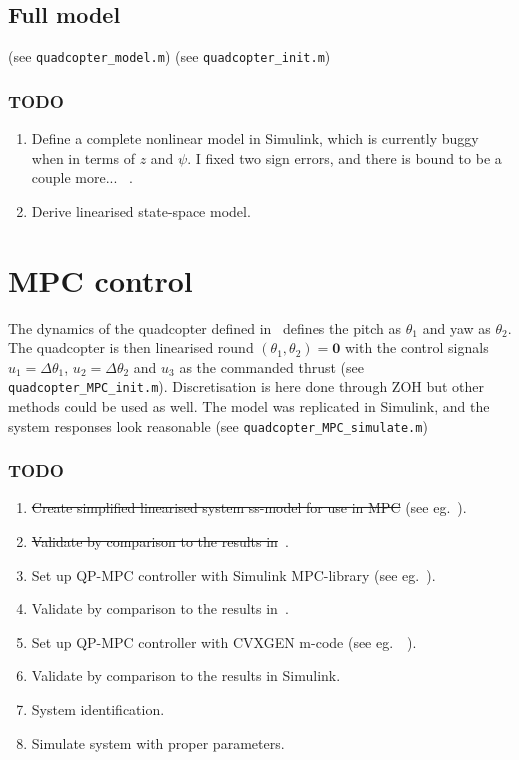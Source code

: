 \documentclass{article}
\begin{document}
\subsection{Full model}
(see \texttt{quadcopter\_model.m})
(see \texttt{quadcopter\_init.m})
\subsubsection*{TODO}
\begin{enumerate}
\item Define a complete nonlinear model in Simulink, which is currently buggy when in terms of $z$ and $\psi$. I fixed two sign errors, and there is bound to be a couple more... ~\cite{luukkonen2011modelling}.
\item Derive linearised state-space model.
\end{enumerate}
\section{MPC control}
The dynamics of the quadcopter defined in~\cite{Bouffard:EECS-2012-241} defines the pitch as $\theta_1$ and yaw as $\theta_2$. The quadcopter is then linearised round $(\theta_1,\theta_2)=\mathbf{0}$ with the control signals $u_1 = \Delta\theta_1$, $u_2 = \Delta\theta_2$ and $u_3$ as the commanded thrust (see \texttt{quadcopter\_MPC\_init.m}). Discretisation is here done through ZOH but other methods could be used as well. The model was replicated in Simulink, and the system responses look reasonable (see \texttt{quadcopter\_MPC\_simulate.m})
\subsubsection*{TODO}
\begin{enumerate}
\item \sout{Create simplified linearised system ss-model for use in MPC} (see eg.~\cite{Bouffard:EECS-2012-241}).
\item \sout{Validate by comparison to the results in}~\cite{Bouffard:EECS-2012-241}.
\item Set up QP-MPC controller with Simulink MPC-library (see eg.~\cite{Bouffard:EECS-2012-241}).
\item Validate by comparison to the results in~\cite{Bouffard:EECS-2012-241}.
\item Set up QP-MPC controller with CVXGEN m-code (see eg.~\cite{Bouffard:EECS-2012-241}~\cite{mattingley2012cvxgen}).
\item Validate by comparison to the results in Simulink.
\item System identification.
\item Simulate system with proper parameters.
\end{enumerate}
\end{document}
